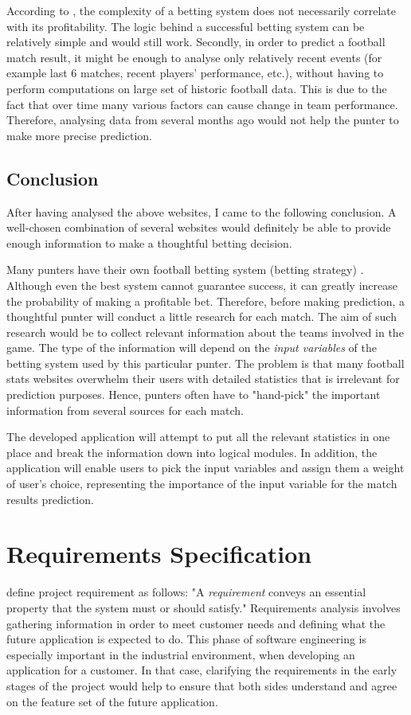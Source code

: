 According to \citet{art:simplebettingsystem}, the complexity of a betting system does not necessarily correlate with its profitability. The logic behind a successful betting system can be relatively simple and would still work. Secondly, in order to predict a football match result, it might be enough to analyse only relatively recent events (for example last 6 matches, recent players' performance, etc.), without having to perform computations on large set of historic football data. This is due to the fact that over time many various factors can cause change in team performance. Therefore, analysing data from several months ago would not help the punter to make more precise prediction.

\subsection{Conclusion}
After having analysed the above websites, I came to the following conclusion. A well-chosen combination of several websites would definitely be able to provide enough information to make a thoughtful betting decision.

Many punters have their own football betting system (betting strategy) \cite{art:simplebettingsystem}. Although even the best system cannot guarantee success, it can greatly increase the probability of making a profitable bet. Therefore, before making prediction, a thoughtful punter will conduct a little research for each match. The aim of such research would be to collect relevant information about the teams involved in the game. The type of the information will depend on the \emph{input variables} of the betting system used by this particular punter. The problem is that many football stats websites overwhelm their users with detailed statistics that is irrelevant for prediction purposes. Hence, punters often have to "hand-pick" the important information from several sources for each match. 
 	
The developed application will attempt to put all the relevant statistics in one place and break the information down into logical modules. In addition, the application will enable users to pick the input variables and assign them a weight of user's choice, representing the importance of the input variable for the match results prediction.
 
\section{Requirements Specification}
\label{sec:requirements_req}
 \citet{book:radice1998software} define project requirement as follows: "A \emph{requirement} conveys an essential property that the system must or should satisfy." Requirements analysis involves gathering information in order to meet customer needs and defining what the future application is expected to do. 
This phase of software engineering is especially important in the industrial environment, when developing an application for a customer. In that case, clarifying the requirements in the early stages of the project would help to ensure that both sides understand and agree on the feature set of the future application. 

